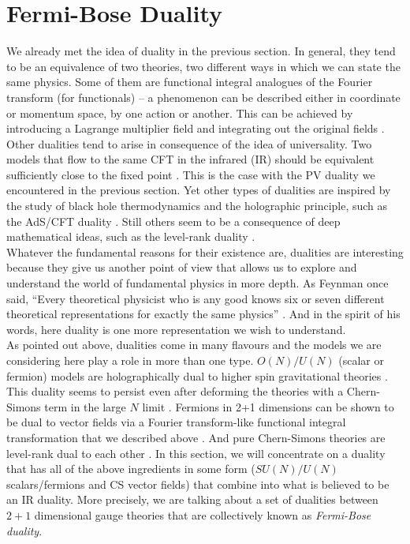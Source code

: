         \section{Fermi-Bose Duality} \label{Fermi-Bose_sec}
        We already met the idea of duality in the previous section. In general, they tend to be an equivalence of two theories, two different ways in which we can state the same physics. Some of them are functional integral analogues of the Fourier transform (for functionals) -- a phenomenon can be described either in coordinate or momentum space, by one action or another. This can be achieved by introducing a Lagrange multiplier field and integrating out the original fields \cite{Barci:1995iy, Burgess:1993np, Fradkin:1994tt, Kapustin:1999ha}. Other dualities tend to arise in consequence of the idea of universality. Two models that flow to the same CFT in the infrared (IR) should be equivalent sufficiently close to the fixed point \cite{Seiberg:1994bz, Seiberg:1994rs}. This is the case with the PV duality we encountered in the previous section.
        Yet other types of dualities are inspired by the study of black hole thermodynamics and the holographic principle, such as the AdS/CFT duality \cite{Maldacena:1997re}. Still others seem to be a consequence of deep mathematical ideas, such as the level-rank duality \cite{Nakanishi:1990hj, Mlawer:1990uv, Naculich:2007nc, Naculich:1990pa, Camperi:1990dk}.\\
        \indent Whatever the fundamental reasons for their existence are, dualities are interesting because they give us another point of view that allows us to explore and understand the world of fundamental physics in more depth. As Feynman once said, ``Every theoretical physicist who is any good knows six or seven different theoretical representations for exactly the same physics'' \cite{Feynman_quote}. And in the spirit of his words, here duality is one more representation we wish to understand.\\
        \indent As pointed out above, dualities come in many flavours and the models we are considering here play a role in more than one type. $O(N)/U(N)$ (scalar or fermion) models are holographically dual to higher spin gravitational theories \cite{Klebanov:2002ja}. This duality seems to persist even after deforming the theories with a Chern-Simons term in the large $N$ limit \cite{Aharony:2011jz}. Fermions in 2+1 dimensions can be shown to be dual to vector fields via a Fourier transform-like functional integral transformation that we described above \cite{Burgess:1993np, Barci:1995iy}. And pure Chern-Simons theories are level-rank dual to each other \cite{Naculich:1990pa, Camperi:1990dk, Mlawer:1990uv, Nakanishi:1990hj, Naculich:2007nc}. In this section, we will concentrate on a duality that has all of the above ingredients in some form ($SU(N)/U(N)$ scalars/fermions and CS vector fields) that combine into what is believed to be an IR duality. More precisely, we are talking about a set of dualities between $2+1$ dimensional gauge theories that are collectively known as \textit{Fermi-Bose duality}.\\
